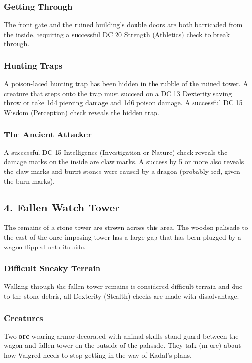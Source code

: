 \documentclass[10pt,a4paper,twoside,bg=print,twocolumn,openany,nodeprecatedcode]{dndbook}
\begin{document}
\subsubsection{Getting Through}
The front gate and the ruined building's double doors are both barricaded from the inside, requiring a successful DC 20 Strength (Athletics) check to break through.

\subsubsection{Hunting Traps}
A poison-laced hunting trap has been hidden in the rubble of the ruined tower. A creature that steps onto the trap must succeed on a DC 13 Dexterity saving throw or take 1d4 piercing damage and 1d6 poison damage. A successful DC 15 Wisdom (Perception) check reveals the hidden trap.

\subsubsection{The Ancient Attacker}
A successful DC 15 Intelligence (Investigation or Nature) check reveals the damage marks on the inside are claw marks. A success by 5 or more also reveals the claw marks and burnt stones were caused by a dragon (probably red, given the burn marks).

\subsection{4. Fallen Watch Tower}
\begin{DndReadAloud}{}
The remains of a stone tower are strewn across this area. The wooden palisade to the east of the once-imposing tower has a large gap that has been plugged by a wagon flipped onto its side.

\end{DndReadAloud}

\subsubsection{Difficult Sneaky Terrain}
Walking through the fallen tower remains is considered difficult terrain and due to the stone debris, all Dexterity (Stealth) checks are made with disadvantage.

\subsubsection{Creatures}
Two \textbf{orc} wearing armor decorated with animal skulls stand guard between the wagon and fallen tower on the outside of the palisade. They talk (in orc) about how Valgred needs to stop getting in the way of Kadal's plans.
\end{document}
